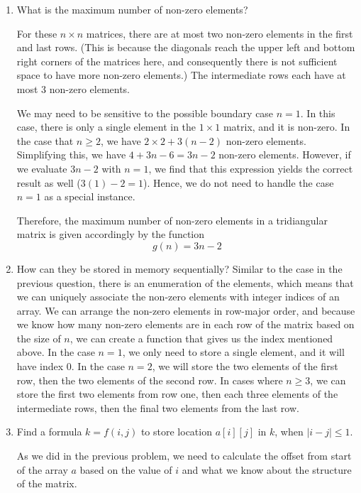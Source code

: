 \documentclass[12pt,letterpaper,final]{report}
\begin{document}
\begin{enumerate}
  \item What is the maximum number of non-zero elements?

        For these $n \times n$ matrices, there are at most two non-zero elements in the first and last rows. (This is because the diagonals reach the upper left and bottom right corners of the matrices here, and consequently there is not sufficient space to have more non-zero elements.) The intermediate rows each have at most 3 non-zero elements.

        We may need to be sensitive to the possible boundary case $n = 1$. In this case, there is only a single element in the $1 \times 1$ matrix, and it is non-zero. In the case that $n \ge 2$, we have $2 \times 2 + 3(n-2)$ non-zero elements. Simplifying this, we have $4 + 3n - 6 = 3n - 2$ non-zero elements. However, if we evaluate $3n -2$ with $n = 1$, we find that this expression yields the correct result as well ($3(1) - 2 = 1$). Hence, we do not need to handle the case $n=1$ as a special instance.

        Therefore, the maximum number of non-zero elements in a tridiangular matrix is given accordingly by the function
        \begin{equation}
          g(n) = 3n - 2
        \end{equation}
  \item How can they be stored in memory sequentially?
        Similar to the case in the previous question, there is an enumeration of the elements, which means that we can uniquely associate the non-zero elements with integer indices of an array. We can arrange the non-zero elements in row-major order, and because we know how many non-zero elements are in each row of the matrix based on the size of $n$, we can create a function that gives us the index mentioned above. In the case $n=1$, we only need to store a single element, and it will have index 0. In the case $n=2$, we will store the two elements of the first row, then the two elements of the second row. In cases where $n \ge 3$, we can store the first two elements from row one, then each three elements of the intermediate rows, then the final two elements from the last row.
  \item Find a formula $k = f(i,j)$ to store location $a[i][j]$ in $k$, when $|i - j| \le 1$.

        As we did in the previous problem, we need to calculate the offset from start of the array $a$ based on the value of $i$ and what we know about the structure of the matrix.


\end{enumerate}
\end{document}
